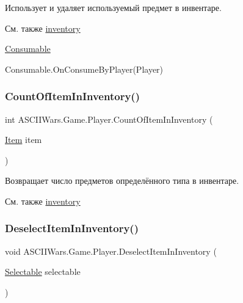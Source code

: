 Использует и удаляет используемый предмет в инвентаре. 

\begin{DoxySeeAlso}{См. также}
\hyperlink{class_a_s_c_i_i_wars_1_1_game_1_1_player_a04acfaa196162f89bfae7aee5ec45480}{inventory} 

\hyperlink{class_a_s_c_i_i_wars_1_1_game_1_1_consumable}{Consumable} 

Consumable.\+On\+Consume\+By\+Player(\+Player) 
\end{DoxySeeAlso}
\hypertarget{class_a_s_c_i_i_wars_1_1_game_1_1_player_acb07b9e02dfe26cae85c1b685517438b}{}\label{class_a_s_c_i_i_wars_1_1_game_1_1_player_acb07b9e02dfe26cae85c1b685517438b} 
\subsubsection{\texorpdfstring{Count\+Of\+Item\+In\+Inventory()}{CountOfItemInInventory()}}
{\footnotesize\ttfamily int A\+S\+C\+I\+I\+Wars.\+Game.\+Player.\+Count\+Of\+Item\+In\+Inventory (\begin{DoxyParamCaption}\item[{\hyperlink{class_a_s_c_i_i_wars_1_1_game_1_1_item}{Item}}]{item }\end{DoxyParamCaption})\hspace{0.3cm}{\ttfamily [inline]}}



Возвращает число предметов определённого типа в инвентаре. 

\begin{DoxySeeAlso}{См. также}
\hyperlink{class_a_s_c_i_i_wars_1_1_game_1_1_player_a04acfaa196162f89bfae7aee5ec45480}{inventory} 
\end{DoxySeeAlso}
\hypertarget{class_a_s_c_i_i_wars_1_1_game_1_1_player_a104ae32d59b6e627d55dc78ff4ffa995}{}\label{class_a_s_c_i_i_wars_1_1_game_1_1_player_a104ae32d59b6e627d55dc78ff4ffa995} 
\subsubsection{\texorpdfstring{Deselect\+Item\+In\+Inventory()}{DeselectItemInInventory()}}
{\footnotesize\ttfamily void A\+S\+C\+I\+I\+Wars.\+Game.\+Player.\+Deselect\+Item\+In\+Inventory (\begin{DoxyParamCaption}\item[{\hyperlink{class_a_s_c_i_i_wars_1_1_game_1_1_selectable}{Selectable}}]{selectable }\end{DoxyParamCaption})\hspace{0.3cm}{\ttfamily [inline]}}



